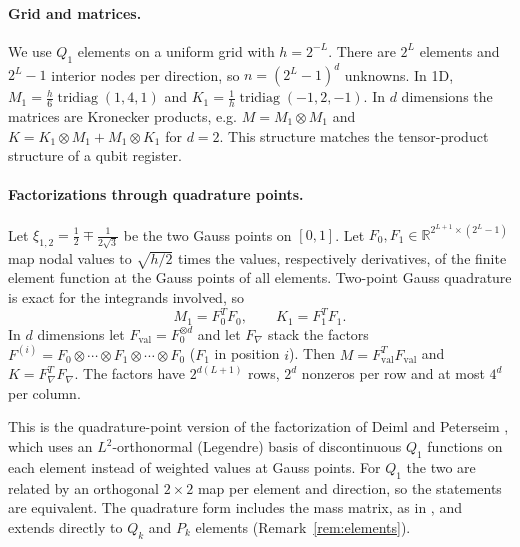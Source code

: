 \documentclass[11pt,a4paper]{article}
\newcommand{\R}{\mathbb{R}}
\theoremstyle{remark}
\begin{document}
\paragraph{Grid and matrices.} We use $Q_1$ elements on a uniform grid with
$h=2^{-L}$. There are $2^L$ elements and $2^L-1$ interior nodes per direction,
so $n=(2^L-1)^d$ unknowns. In 1D,
$M_1=\frac h6\operatorname{tridiag}(1,4,1)$ and $K_1=\frac1h\operatorname{tridiag}(-1,2,-1)$. In $d$
dimensions the matrices are Kronecker products, e.g.
$M=M_1\otimes M_1$ and $K=K_1\otimes M_1+M_1\otimes K_1$ for $d=2$. This structure matches the
tensor-product structure of a qubit register.

\paragraph{Factorizations through quadrature points.} Let $\xi_{1,2}=\frac12\mp\frac1{2\sqrt3}$
be the two Gauss points on $[0,1]$. Let $F_0,F_1\in\R^{2^{L+1}\times(2^L-1)}$ map nodal
values to $\sqrt{h/2}$ times the values, respectively derivatives, of the finite
element function at the Gauss points of all elements. Two-point Gauss
quadrature is exact for the integrands involved, so
\begin{equation}\label{eq:fact1d}
M_1=F_0^TF_0,\qquad K_1=F_1^TF_1 .
\end{equation}
In $d$ dimensions let $F_{\mathrm{val}}=F_0^{\otimes d}$ and let $F_\nabla$ stack the factors
$F^{(i)}=F_0\otimes\cdots\otimes F_1\otimes\cdots\otimes F_0$ ($F_1$ in position $i$). Then
$M=F_{\mathrm{val}}^TF_{\mathrm{val}}$ and $K=F_\nabla^TF_\nabla$. The factors have
$2^{d(L+1)}$ rows, $2^d$ nonzeros per row and at most $4^d$ per column.

This is the quadrature-point version of the factorization of Deiml and
Peterseim \cite[(6.1)]{DP26}, which uses an $L^2$-orthonormal (Legendre) basis
of discontinuous $Q_1$ functions on each element instead of weighted values
at Gauss points. For $Q_1$ the two are related by an orthogonal $2\times2$ map per
element and direction, so the statements are equivalent. The quadrature
form includes the mass matrix, as in \cite{YYZ26}, and extends directly to
$Q_k$ and $P_k$ elements (Remark~\ref{rem:elements}).
\end{document}
